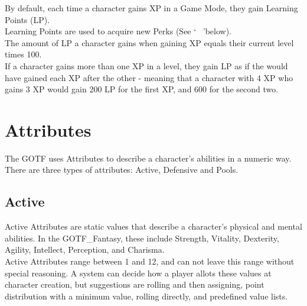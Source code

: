 By default, each time a character gains XP in a Game Mode, they gain Learning Points (LP).\\
Learning Points are used to acquire new Perks (See \lq ~ \rq below).\\
The amount of LP a character gains when gaining XP equals their current level times 100.\\
If a character gains more than one XP in a level, they gain LP as if the would have gained each XP after the other - meaning that a character with 4 XP who gains 3 XP would gain 200 LP for the first XP, and 600 for the second two.\\

\section{Attributes}\label{ch:attributes}
The GOTF uses Attributes to describe a character's abilities in a numeric way.
There are three types of attributes: Active, Defensive and Pools.\\

\subsection{Active}\label{subsec:activeattributes}
Active Attributes are static values that describe a character's physical and mental abilities.
In the GOTF\_Fantasy, these include Strength, Vitality, Dexterity, Agility, Intellect, Perception, and Charisma.\\
Active Attributes range between 1 and 12, and can not leave this range without special reasoning.
A system can decide how a player allots these values at character creation, but suggestions are rolling and then assigning, point distribution with a minimum value, rolling directly, and predefined value lists.\\

